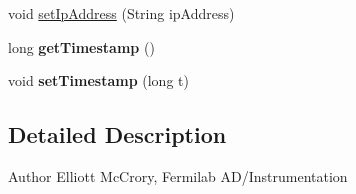 \begin{DoxyCompactItemize}
\item 
void \hyperlink{classgov_1_1fnal_1_1ppd_1_1dd_1_1emergency_1_1EmergencyMessage_a1be68f22b1178b1653de2de0289807d2}{set\-Ip\-Address} (String ip\-Address)
\item 
\hypertarget{classgov_1_1fnal_1_1ppd_1_1dd_1_1emergency_1_1EmergencyMessage_a105b9539c90164741e877231cb6abba0}{long {\bfseries get\-Timestamp} ()}\label{classgov_1_1fnal_1_1ppd_1_1dd_1_1emergency_1_1EmergencyMessage_a105b9539c90164741e877231cb6abba0}

\item 
\hypertarget{classgov_1_1fnal_1_1ppd_1_1dd_1_1emergency_1_1EmergencyMessage_a5a13008d70e7343dbcdf7af59bae4003}{void {\bfseries set\-Timestamp} (long t)}\label{classgov_1_1fnal_1_1ppd_1_1dd_1_1emergency_1_1EmergencyMessage_a5a13008d70e7343dbcdf7af59bae4003}

\end{DoxyCompactItemize}


\subsection{Detailed Description}
\begin{DoxyAuthor}{Author}
Elliott Mc\-Crory, Fermilab A\-D/\-Instrumentation 
\end{DoxyAuthor}


